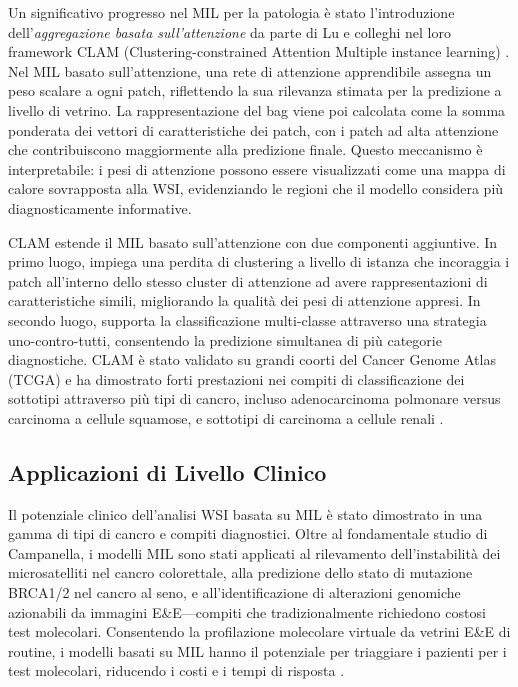 Un significativo progresso nel MIL per la patologia è stato l'introduzione dell'\emph{aggregazione basata sull'attenzione} da parte di Lu e colleghi nel loro framework CLAM (Clustering-constrained Attention Multiple instance learning) \cite{lu2020}. Nel MIL basato sull'attenzione, una rete di attenzione apprendibile assegna un peso scalare a ogni patch, riflettendo la sua rilevanza stimata per la predizione a livello di vetrino. La rappresentazione del bag viene poi calcolata come la somma ponderata dei vettori di caratteristiche dei patch, con i patch ad alta attenzione che contribuiscono maggiormente alla predizione finale. Questo meccanismo è interpretabile: i pesi di attenzione possono essere visualizzati come una mappa di calore sovrapposta alla WSI, evidenziando le regioni che il modello considera più diagnosticamente informative.

CLAM estende il MIL basato sull'attenzione con due componenti aggiuntive. In primo luogo, impiega una perdita di clustering a livello di istanza che incoraggia i patch all'interno dello stesso cluster di attenzione ad avere rappresentazioni di caratteristiche simili, migliorando la qualità dei pesi di attenzione appresi. In secondo luogo, supporta la classificazione multi-classe attraverso una strategia uno-contro-tutti, consentendo la predizione simultanea di più categorie diagnostiche. CLAM è stato validato su grandi coorti del Cancer Genome Atlas (TCGA) e ha dimostrato forti prestazioni nei compiti di classificazione dei sottotipi attraverso più tipi di cancro, incluso adenocarcinoma polmonare versus carcinoma a cellule squamose, e sottotipi di carcinoma a cellule renali \cite{lu2020}.

\subsection{Applicazioni di Livello Clinico}

Il potenziale clinico dell'analisi WSI basata su MIL è stato dimostrato in una gamma di tipi di cancro e compiti diagnostici. Oltre al fondamentale studio di Campanella, i modelli MIL sono stati applicati al rilevamento dell'instabilità dei microsatelliti nel cancro colorettale, alla predizione dello stato di mutazione BRCA1/2 nel cancro al seno, e all'identificazione di alterazioni genomiche azionabili da immagini E\&E---compiti che tradizionalmente richiedono costosi test molecolari. Consentendo la profilazione molecolare virtuale da vetrini E\&E di routine, i modelli basati su MIL hanno il potenziale per triaggiare i pazienti per i test molecolari, riducendo i costi e i tempi di risposta \cite{song2023}.


